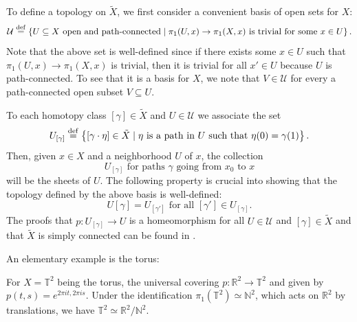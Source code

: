 \documentclass{report}
\begin{document}
To define a topology on $\tilde X$, we first consider a convenient basis of open sets for $X$:
\[
\mathcal U \overset{\mathrm{def}}{=} \left\{ U \subseteq X \text{ open and path-connected} \mid \pi_1(U, x) \to \pi_1(X,x) \text{ is trivial for some } x \in U \right\}.
\]
Note that the above set is well-defined since if there exists some $x\in U$ such that $\pi_1(U,x) \to \pi_1(X,x)$ is trivial, then it is trivial for all $x' \in U$ because $U$ is path-connected.
To see that it is a basis for $X$,  we note that $V \in \mathcal U$ for every a path-connected open subset $V\subseteq U$.

To each homotopy class $[\gamma] \in \tilde X$ and $U \in \mathcal U$ we associate the set
\[
U_{[\gamma]} \overset{\mathrm{def}}{=} \left\{ [\gamma \cdot \eta] \in \tilde X \mid \eta \text{ is a path in } U \text{ such that } \eta(0) = \gamma(1) \right\}.
\]
Then, given $x \in X$ and a neighborhood $U$ of $x$, the collection
\[
U_{[\gamma]} \text{ for paths } \gamma \text{ going from } x_0 \text{ to } x  
\]
will be the sheets of $U$.
The following property is crucial into showing that the topology defined by the above basis is well-defined:
\[
U[\gamma] = U_[\gamma'] \text{ for all } [\gamma'] \in U_{[\gamma]}.
\]
The proofs that $p:U_[\gamma] \to U$ is a homeomorphism for all $U \in \mathcal U$ and $[\gamma] \in \tilde X$ and that $\tilde X$ is simply connected can be found in \cite{hatcher2002topology}.

An elementary example is the torus:
\begin{example}
    For $X = \mathbb T^2$ being the torus, the universal covering $p: \mathbb R^2 \to \mathbb T^2$ and given by $p(t,s) = e^{2\pi i t, 2\pi i s }$.
    Under the identification $\pi_1(\mathbb T^2) \simeq \mathbb N^2$, which acts on $\mathbb R^2$ by translations, we have $\mathbb T^2 \simeq \mathbb R^2 / \mathbb N^2$.
\end{example}
\end{document}
